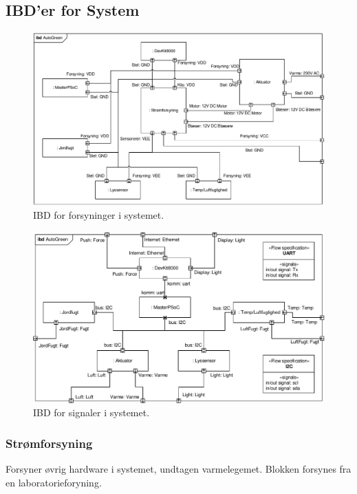 \subsection{IBD'er for System}

\begin{figure}[h]
\centering 
\includegraphics[width={\textwidth}] {../fig/ibd_system_forsyninger.pdf}
\caption{IBD for forsyninger i systemet.}
\label{fig:ibd_system_forsyn}
\end{figure}

\begin{figure}[h]
\centering 
\includegraphics[width={\textwidth}] {../fig/ibd_system_signaler.pdf}
\caption{IBD for signaler i systemet.}
\label{fig:ibd_system_signal}
\end{figure}



\subsubsection{Strømforsyning}
Forsyner øvrig hardware i systemet, undtagen varmelegemet. Blokken forsynes fra en laboratorieforyning.
